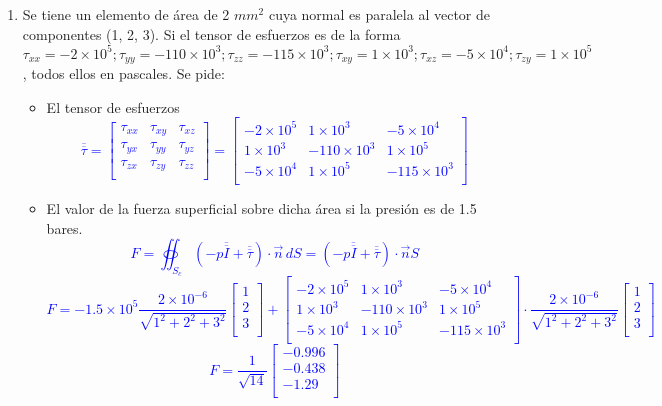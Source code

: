 \begin{enumerate}
	
	
	\newpage
	
	\item Se tiene un elemento de área de 2 $mm^2$ cuya normal es paralela al vector de componentes
	(1, 2, 3). Si el tensor de esfuerzos es de la forma $\tau_{xx} = -2 \times 10^5; \tau_{yy} = -110 \times 10^ 3; \tau_{zz} =
	-115 \times 10^3; \tau_{xy} = 1\times10^3; \tau_{xz} = -5 \times 10^4;  \tau_{zy} = 1 \times 10^5$, todos ellos en pascales. Se pide:
	\begin{itemize}
		\item 	El tensor de esfuerzos
		\textcolor{blue}{
		\[\overline{\overline{\tau}}=\begin{bmatrix}
			\tau_{xx} &\tau_{xy}&\tau_{xz}\\
				\tau_{yx} &\tau_{yy}&\tau_{yz}\\
					\tau_{zx} &\tau_{zy}&\tau_{zz}\\
		\end{bmatrix}=
		\begin{bmatrix}
		 -2 \times 10^5&1\times10^3&-5 \times 10^4\\
		1\times10^3& -110 \times 10^ 3&1 \times 10^5\\
		 -5 \times 10^4&1 \times 10^5&-115 \times 10^3\\
		\end{bmatrix}
		\]}
		\item El valor de la fuerza superficial sobre dicha área  si la presión es de 1.5 bares.
			\textcolor{blue}{\[F=\oiint_{S_c}\left(-p\overline{\overline{I}}+\overline{\overline{\tau}}\right)\cdot\vec{n}\,dS=\left(-p\overline{\overline{I}}+\overline{\overline{\tau}}\right)\cdot\vec{n}S \]
			\[	F=-1.5\times10^5 \dfrac{2\times 10^{-6}}{\sqrt{1^2+2^2+3^2}}\begin{bmatrix}
					1 \\
					2 \\
					3 \\
				\end{bmatrix}+	\begin{bmatrix}
				-2 \times 10^5&1\times10^3&-5 \times 10^4\\
				1\times10^3& -110 \times 10^ 3&1 \times 10^5\\
				-5 \times 10^4&1 \times 10^5&-115 \times 10^3\\
				\end{bmatrix}\cdot\dfrac{2\times 10^{-6}}{\sqrt{1^2+2^2+3^2}}\begin{bmatrix}
				1 \\
				2 \\
				3 \\
				\end{bmatrix}\]
			\[F=\dfrac{1}{\sqrt{14}}\begin{bmatrix}
				-0.996 \\
				-0.438 \\
				-1.29 \\
			\end{bmatrix}\]}
	\end{itemize}
\newpage
	


\end{enumerate}
